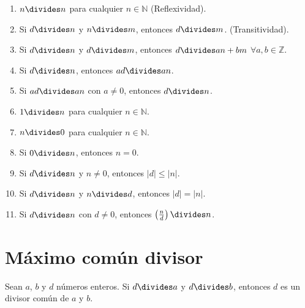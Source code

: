 \begin{enumerate}[font={\bfseries},label={\arabic*)}]

\item\label{prop:1} $n\divides n$ para cualquier $n\in\mathbb{N}$ (Reflexividad).

\item\label{prop:2} Si $d\divides n$ y $n\divides m$, entonces $d\divides m$. (Transitividad).

\item\label{prop:3} Si $d\divides n$ y $d\divides m$, entonces $d\divides an+bm$ $\forall a,b\in\mathbb{Z}$.

\item\label{prop:4} Si $d\divides n$, entonces $ad\divides an$.

\item\label{prop:5} Si $ad\divides an$ con $a\neq0$, entonces $d\divides n$.

\item\label{prop:6} $1\divides n$ para cualquier $n\in\mathbb{N}$.

\item\label{prop:7} $n\divides 0$ para cualquier $n\in\mathbb{N}$.

\item\label{prop:8} Si $0\divides n$, entonces $n=0$.

\item\label{prop:9} Si $d\divides n$ y $n\neq0$, entonces $|d|\leq|n|$.

\item\label{prop:10} Si $d\divides n$ y $n\divides d$, entonces $|d|=|n|$.

\item\label{prop:11} Si $d\divides n$ con $d\neq0$, entonces $\left(\frac{n}{d}\right)\divides n$.

\end{enumerate}

\section{Máximo común divisor}

\begin{definition}\label{def:1.2}

Sean $a$, $b$ y $d$ números enteros. Si $d\divides a$ y $d\divides b$, entonces $d$ es un divisor común de $a$ y $b$.

\end{definition}

